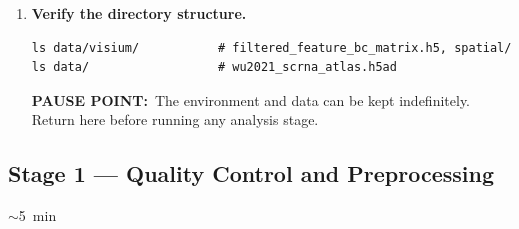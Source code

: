 \documentclass[12pt, a4paper]{article}
\newcommand{\pausept}[1]{\par\smallskip\noindent%
    {\bfseries PAUSE POINT:}\ #1\par\smallskip}
\newcommand{\timing}[1]{%
    \begin{tcolorbox}[colback=orange!7,colframe=orange!55!black,
        fonttitle=\bfseries\small,title=Timing,
        boxrule=0.5pt,left=4pt,right=4pt,top=2pt,bottom=2pt,
        before upper=\small]
    #1
    \end{tcolorbox}\vspace{2pt}}
\begin{document}
\begin{enumerate}
\item \textbf{Verify the directory structure.}
\begin{lstlisting}
ls data/visium/           # filtered_feature_bc_matrix.h5, spatial/
ls data/                  # wu2021_scrna_atlas.h5ad
\end{lstlisting}
\pausept{The environment and data can be kept indefinitely.
Return here before running any analysis stage.}

\end{enumerate}

\subsection{Stage 1 — Quality Control and Preprocessing}

\timing{$\sim$5~min}
\end{document}

